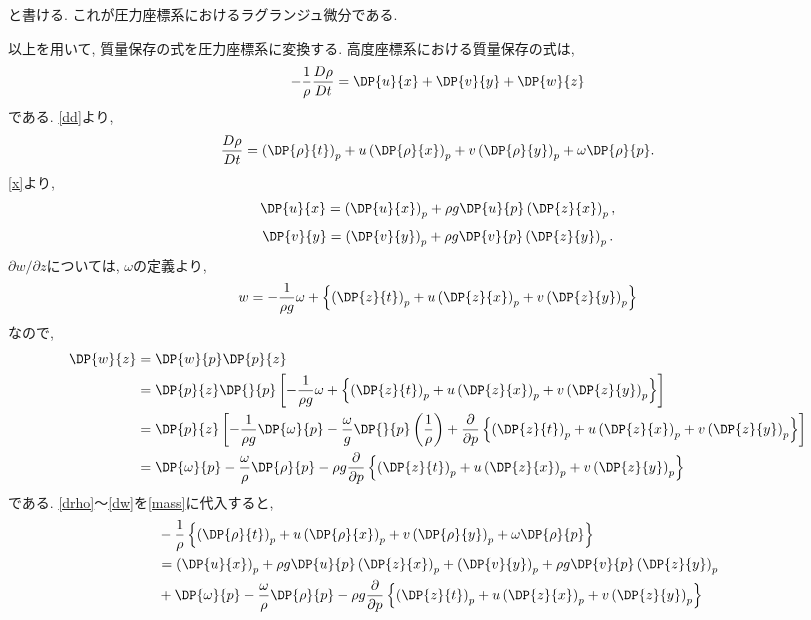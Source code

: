 \documentclass[a4j,12pt,openbib,oneside,dvipdfmx]{jarticle}
\begin{document}
と書ける. これが圧力座標系におけるラグランジュ微分である.\\
\par
以上を用いて, 質量保存の式を圧力座標系に変換する. 高度座標系における質量保存の式は,
\begin{equation}
  -\frac{1}{\rho}\frac{D\rho}{Dt}=\DP{u}{x}+\DP{v}{y}+\DP{w}{z} \label{mass}
\end{equation}
である. \eqref{dd}より,
\begin{equation}
  \frac{D\rho}{Dt}=\left(\DP{\rho}{t}\right)_p+u\left(\DP{\rho}{x}\right)_p+v\left(\DP{\rho}{y}\right)_p+\omega{\DP{\rho}{p}} \label{drho}.
\end{equation}
\eqref{x}より,
\begin{equation}
  \DP{u}{x}=\left(\DP{u}{x}\right)_p+\rho{g}\DP{u}{p}\left(\DP{z}{x}\right)_p , \label{u}
\end{equation}
\begin{equation}
  \DP{v}{y}=\left(\DP{v}{y}\right)_p+\rho{g}\DP{v}{p}\left(\DP{z}{y}\right)_p. \label{v}
\end{equation}
$\partial{w}/\partial{z}$については, $\omega$の定義より,
\begin{equation}
  w=-\frac{1}{\rho{g}}\omega+\left\{\left(\DP{z}{t}\right)_p+u\left(\DP{z}{x}\right)_p+v\left(\DP{z}{y}\right)_p\right\} \nonumber
\end{equation}
なので, 
\begin{align}
  \DP{w}{z}&=\DP{w}{p}\DP{p}{z}  \nonumber \\
  &=\DP{p}{z}\DP{}{p}\left[-\frac{1}{\rho{g}}\omega+\left\{\left(\DP{z}{t}\right)_p+u\left(\DP{z}{x}\right)_p+v\left(\DP{z}{y}\right)_p\right\}\right] \nonumber \\
        &=\DP{p}{z}\left[-\frac{1}{\rho{g}}\DP{\omega}{p}-\frac{\omega}{g}\DP{}{p}\left(\frac{1}{\rho}\right)+\frac{\partial}{\partial{p}}\left\{\left(\DP{z}{t}\right)_p+u\left(\DP{z}{x}\right)_p+v\left(\DP{z}{y}\right)_p\right\}\right] \nonumber \\
        &=\DP{\omega}{p}-\frac{\omega}{\rho}\DP{\rho}{p}-\rho{g}\frac{\partial}{\partial{p}}\left\{\left(\DP{z}{t}\right)_p+u\left(\DP{z}{x}\right)_p+v\left(\DP{z}{y}\right)_p\right\} \label{dw}
\end{align}
である. \eqref{drho}〜\eqref{dw}を\eqref{mass}に代入すると, 
\begin{align}
  &-\frac{1}{\rho}\left\{\left(\DP{\rho}{t}\right)_p+u\left(\DP{\rho}{x}\right)_p+v\left(\DP{\rho}{y}\right)_p+\omega{\DP{\rho}{p}}\right\}\nonumber \\
  &=\left(\DP{u}{x}\right)_p+\rho{g}\DP{u}{p}\left(\DP{z}{x}\right)_p+\left(\DP{v}{y}\right)_p+\rho{g}\DP{v}{p}\left(\DP{z}{y}\right)_p \nonumber \\
  &+\DP{\omega}{p}-\frac{\omega}{\rho}\DP{\rho}{p}-\rho{g}\frac{\partial}{\partial{p}}\left\{\left(\DP{z}{t}\right)_p+u\left(\DP{z}{x}\right)_p+v\left(\DP{z}{y}\right)_p\right\} \label{m}
\end{align}
\end{document}

